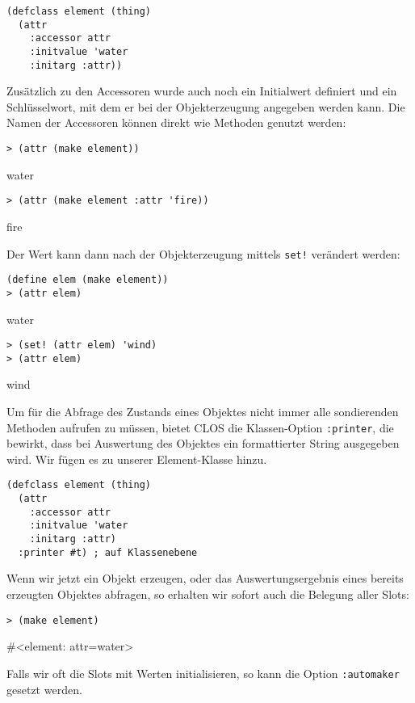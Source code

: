 \begin{lstlisting}
(defclass element (thing)
  (attr
    :accessor attr
    :initvalue 'water
    :initarg :attr))
\end{lstlisting}

Zusätzlich zu den Accessoren wurde auch noch ein Initialwert definiert und ein Schlüsselwort, mit dem er bei der Objekterzeugung angegeben werden kann. Die Namen der Accessoren können direkt wie Methoden genutzt werden:

\begin{lstlisting}
> (attr (make element))
\end{lstlisting}
{\routput water}

\begin{lstlisting}
> (attr (make element :attr 'fire))
\end{lstlisting}
{\routput fire}

Der Wert kann dann nach der Objekterzeugung mittels \texttt{set!} verändert werden:

\begin{lstlisting}
(define elem (make element))
> (attr elem)
\end{lstlisting}
{\routput water}

\begin{lstlisting}
> (set! (attr elem) 'wind)
> (attr elem)
\end{lstlisting}
{\routput wind}

Um für die Abfrage des Zustands eines Objektes nicht immer alle sondierenden Methoden aufrufen zu müssen, bietet CLOS die Klassen-Option \texttt{:printer}, die bewirkt, dass bei Auswertung des Objektes ein formattierter String ausgegeben wird. Wir fügen es zu unserer Element-Klasse hinzu.

\begin{lstlisting}
(defclass element (thing)
  (attr
    :accessor attr
    :initvalue 'water
    :initarg :attr)
  :printer #t) ; auf Klassenebene
\end{lstlisting}

Wenn wir jetzt ein Objekt erzeugen, oder das Auswertungsergebnis eines bereits erzeugten Objektes abfragen, so erhalten wir sofort auch die Belegung aller Slots:

\begin{lstlisting}
> (make element)
\end{lstlisting}

{\routput \#<element: attr=water>}

Falls wir oft die Slots mit Werten initialisieren, so kann die Option \texttt{:automaker} gesetzt werden.

